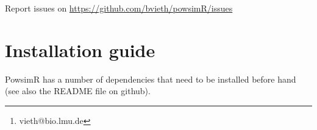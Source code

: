 \documentclass{article}\usepackage[]{graphicx}\usepackage[usenames,dvipsnames]{color}
\author{Beate Vieth \footnote{vieth@bio.lmu.de}}
\begin{document}
\maketitle


Report issues on \url{https://github.com/bvieth/powsimR/issues}

\newpage

\tableofcontents



\newpage

\section{Installation guide}

PowsimR has a number of dependencies that need to be installed before hand (see also the README file on github).
\end{document}
